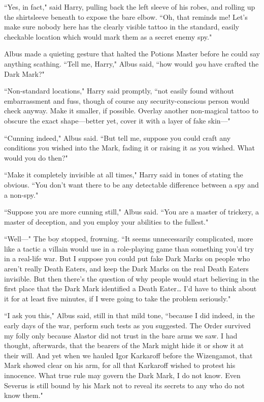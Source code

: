 ``Yes, in fact," said Harry, pulling back the left sleeve of his robes, and rolling up the shirtsleeve beneath to expose the bare elbow. ``Oh, that reminds me! Let's make sure nobody here has the clearly visible tattoo in the standard, easily checkable location which would mark them as a secret enemy spy."

Albus made a quieting gesture that halted the Potions Master before he could say anything scathing. ``Tell me, Harry," Albus said, ``how would \emph{you} have crafted the Dark Mark?"

``Non-standard locations," Harry said promptly, ``not easily found without embarrassment and fuss, though of course any security\hyp{}conscious person would check anyway. Make it smaller, if possible. Overlay another non-magical tattoo to obscure the exact shape—better yet, cover it with a layer of fake skin—"

``Cunning indeed," Albus said. ``But tell me, suppose you could craft any conditions you wished into the Mark, fading it or raising it as you wished. What would you do then?"

``Make it completely invisible at all times," Harry said in tones of stating the obvious. ``You don't want there to be any detectable difference between a spy and a non-spy."

``Suppose you are more cunning still," Albus said. ``You are a master of trickery, a master of deception, and you employ your abilities to the fullest."

``Well—" The boy stopped, frowning. ``It seems unnecessarily complicated, more like a tactic a villain would use in a role-playing game than something you'd try in a real-life war. But I suppose you could put fake Dark Marks on people who aren't really Death Eaters, and keep the Dark Marks on the real Death Eaters invisible. But then there's the question of why people would start believing in the first place that the Dark Mark identified a Death Eater{\ldots} I'd have to think about it for at least five minutes, if I were going to take the problem seriously."

``I ask you this," Albus said, still in that mild tone, ``because I did indeed, in the early days of the war, perform such tests as you suggested. The Order survived my folly only because Alastor did not trust in the bare arms we saw. I had thought, afterwards, that the bearers of the Mark might hide it or show it at their will. And yet when we hauled Igor Karkaroff before the Wizengamot, that Mark showed clear on his arm, for all that Karkaroff wished to protest his innocence. What true rule may govern the Dark Mark, I do not know. Even Severus is still bound by his Mark not to reveal its secrets to any who do not know them."

